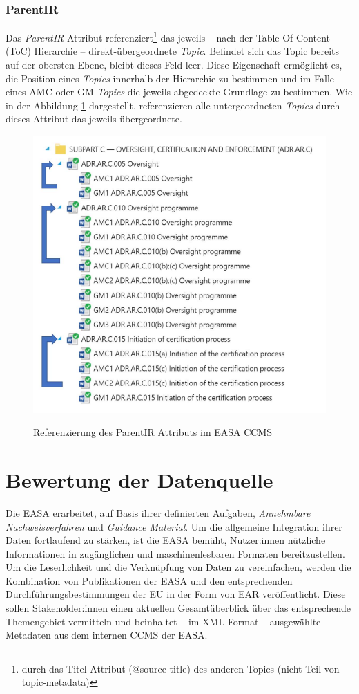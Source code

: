     
\subsubsection{ParentIR}

    Das \textit{ParentIR} Attribut referenziert\footnote{durch das Titel-Attribut (@source-title) des anderen Topics (nicht Teil von topic-metadata)} das jeweils -- nach der Table Of Content (ToC) Hierarchie -- direkt-übergeordnete \textit{Topic}.
    Befindet sich das Topic bereits auf der obersten Ebene, bleibt dieses Feld leer.
    Diese Eigenschaft ermöglicht es, die Position eines \textit{Topics} innerhalb der Hierarchie zu bestimmen und im Falle eines \ac{AMC} oder \ac{GM} \textit{Topics} die jeweils abgedeckte Grundlage zu bestimmen.
    Wie in der Abbildung \ref{fig:parent_ir} dargestellt, referenzieren alle untergeordneten \textit{Topics} durch dieses Attribut das jeweils übergeordnete. 

    \begin{figure}[h]
        \centering
        \includegraphics[width=0.75\linewidth]{gfx/parentir.png}
        \caption{Referenzierung des ParentIR Attributs im EASA CCMS}
                                                                                    \cite[31]{easa_xml_doc}
        \label{fig:parent_ir}
    \end{figure}

\pagebreak
\section{Bewertung der Datenquelle}

    Die \acf{EASA} erarbeitet, auf Basis ihrer definierten Aufgaben, \textit{Annehmbare Nachweisverfahren} und \textit{Guidance Material}.
    Um die allgemeine Integration ihrer Daten fortlaufend zu stärken, ist die \ac{EASA} bemüht,  Nutzer:innen nützliche Informationen in zugänglichen und maschinenlesbaren Formaten bereitzustellen. 
    Um die Leserlichkeit und die Verknüpfung von Daten zu vereinfachen, werden die Kombination von Publikationen der \ac{EASA} und den entsprechenden Durchführungsbestimmungen der \ac{EU} in der Form von \acf{EAR} veröffentlicht.
    Diese sollen Stakeholder:innen einen aktuellen Gesamtüberblick über das entsprechende Themengebiet vermitteln und beinhaltet -- im XML Format -- ausgewählte Metadaten aus dem internen \ac{CCMS} der \ac{EASA}.
    

